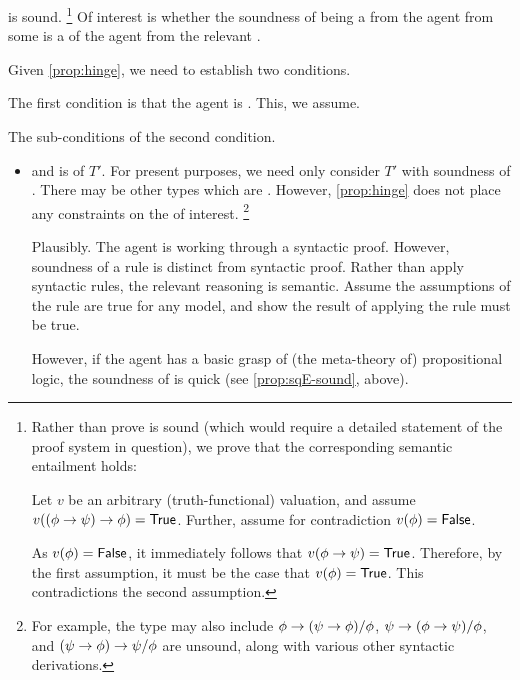 \begin{note}
  \sqE{} is sound.%
  \footnote{
    \label{prop:sqE-sound}
    Rather than prove \sqE{} is sound (which would require a detailed statement of the proof system in question), we prove that the corresponding semantic entailment holds:

    Let \(v\) be an arbitrary (truth-functional) valuation, and assume \(v((\phi \rightarrow \psi) \rightarrow \phi) = \valI{True}\).
    Further, assume for contradiction \(v(\phi) = \valI{False}\).

    As \(v(\phi) = \valI{False}\), it immediately follows that \(v(\phi \rightarrow \psi) = \valI{True}\).
    Therefore, by the first assumption, it must be the case that \(v(\phi) = \valI{True}\).
    This contradictions the second assumption.
  }
  Of interest is whether the soundness of \sqE{} being a \fc{} from the agent from some \pool{} is a \requ{} of the agent \tCV{}  from the relevant \pool{}.

  Given \autoref{prop:hinge}, we need to establish two conditions.

  The first condition is that the agent is \tC{} .
  This, we assume.

  The sub-conditions of the second condition.

  \begin{itemize}
  \item
    \tRep{} and \sqE{} is \tI{} of \(T'\).
    For present purposes, we need only consider \(T'\) with soundness of \sqE{}.
    There may be other types which are .
    However, \autoref{prop:hinge} does not place any constraints on the \tRep{} of interest.%
    \footnote{
      For example, the type may also include \(\phi \rightarrow (\psi \rightarrow \phi) \space/\space \phi\), \(\psi \rightarrow (\phi \rightarrow \psi) \space/\space \phi\), and \((\psi \rightarrow \phi) \rightarrow \psi \space/\space \phi\) are unsound, along with various other syntactic derivations.
    }

    Plausibly.
    The agent is working through a syntactic proof.
    However, soundness of a rule is distinct from syntactic proof.
    Rather than apply syntactic rules, the relevant reasoning is semantic.
    Assume the assumptions of the rule are true for any model, and show the result of applying the rule must be true.

    However, if the agent has a basic grasp of (the meta-theory of) propositional logic, the soundness of \sqE{} is quick (see \autoref{prop:sqE-sound}, above).


\end{itemize}
\end{note}

